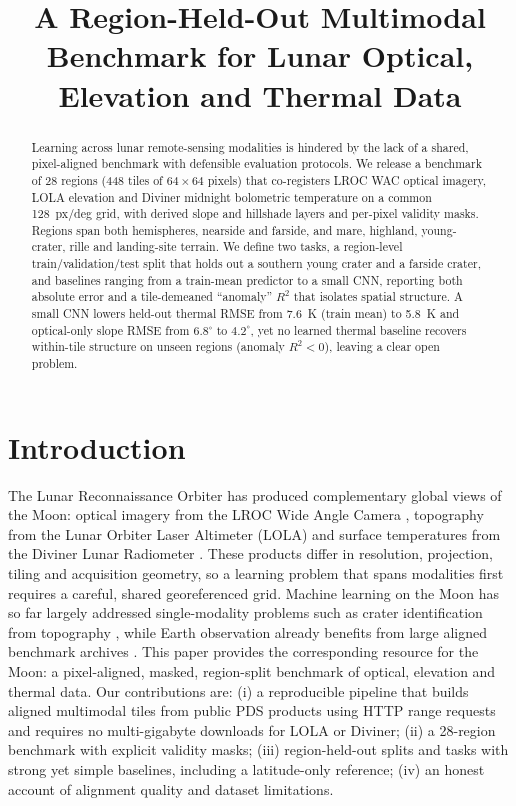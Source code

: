 \documentclass[10pt]{article}
\title{A Region-Held-Out Multimodal Benchmark for Lunar Optical, Elevation and Thermal Data}
\author{\TODO{authors}}
\date{}
\begin{document}
\maketitle

\begin{abstract}
Learning across lunar remote-sensing modalities is hindered by the lack of a
shared, pixel-aligned benchmark with defensible evaluation protocols. We
release a benchmark of 28 regions (448 tiles of $64\times64$ pixels) that
co-registers LROC WAC optical imagery, LOLA elevation and Diviner midnight
bolometric temperature on a common 128~px/deg grid, with derived slope and
hillshade layers and per-pixel validity masks. Regions span both hemispheres,
nearside and farside, and mare, highland, young-crater, rille and landing-site
terrain. We define two tasks, a region-level train/validation/test split that
holds out a southern young crater and a farside crater, and baselines ranging
from a train-mean predictor to a small CNN, reporting both absolute error and a
tile-demeaned ``anomaly'' $R^2$ that isolates spatial structure.
A small CNN lowers held-out thermal RMSE from 7.6~K (train mean) to 5.8~K and
optical-only slope RMSE from $6.8^\circ$ to $4.2^\circ$, yet no learned thermal
baseline recovers within-tile structure on unseen regions (anomaly $R^2<0$),
leaving a clear open problem.
\end{abstract}

\section{Introduction}
The Lunar Reconnaissance Orbiter has produced complementary global views of the
Moon: optical imagery from the LROC Wide Angle Camera \cite{robinson2010lroc},
topography from the Lunar Orbiter Laser Altimeter (LOLA)
\cite{smith2010lola,smith2017lola} and surface temperatures from the Diviner
Lunar Radiometer \cite{paige2010diviner,williams2017diviner}. These products
differ in resolution, projection, tiling and acquisition geometry, so a
learning problem that spans modalities first requires a careful, shared
georeferenced grid. Machine learning on the Moon has so far largely addressed
single-modality problems such as crater identification from topography
\cite{silburt2019deepmoon}, while Earth observation already benefits from
large aligned benchmark archives \cite{sumbul2019bigearthnet,schmitt2019sen12ms}.
This paper provides the corresponding resource for the Moon: a pixel-aligned,
masked, region-split benchmark of optical, elevation and thermal data.
Our contributions are: (i) a reproducible pipeline that builds aligned
multimodal tiles from public PDS products using HTTP range requests and
requires no multi-gigabyte downloads for LOLA or Diviner; (ii) a 28-region
benchmark with explicit validity masks; (iii) region-held-out splits and tasks
with strong yet simple baselines, including a latitude-only reference;
(iv) an honest account of alignment quality and dataset limitations.
\end{document}
